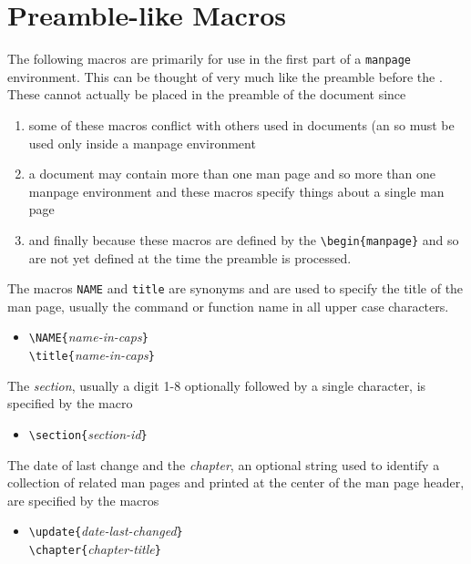 \section{Preamble-like Macros}
The following macros are primarily for use in the first part of
a {\tt manpage} environment.  This can be thought of very much like the
preamble before the \verb||.  These cannot actually be
placed in the preamble of the document since 
\begin{enumerate}
  \item some of these macros conflict with others used in documents (an
        so must be used only inside a manpage environment
  \item a document may contain more than one man page and so more than
        one manpage environment and these macros specify things about
        a single man page
  \item and finally because these macros are defined by the
        \verb|\begin{manpage}| and so are not yet defined at the time
        the preamble is processed.
\end{enumerate}

The macros {\tt NAME} and {\tt title} are synonyms and are used to
specify the title of the man page, usually the command or function
name in all upper case characters.
  \begin{itemize}
    \item[]
          \verb|\NAME{|{\it name-in-caps}\verb|}|\\
          \verb|\title{|{\it name-in-caps}\verb|}|
  \end{itemize}

The {\it section}, usually a digit 1-8 optionally followed by a single
character, is specified by the macro
  \begin{itemize}
    \item[]
          \verb|\section{|{\it section-id}\verb|}|
  \end{itemize}

The  date of last change and the {\it chapter}, an optional string
used to identify a collection of related man pages and printed at the
center of the man page header, are specified by the macros
  \begin{itemize}
    \item[]
          \verb|\update{|{\it date-last-changed}\verb|}|\\
          \verb|\chapter{|{\it chapter-title}\verb|}|
  \end{itemize}

